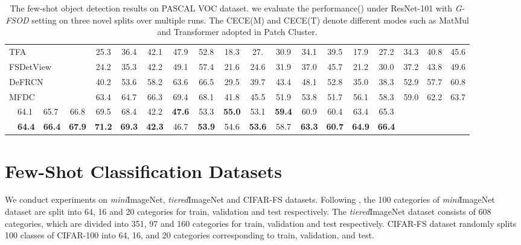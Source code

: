 \documentclass{article}
\begin{document}
\begin{table*}[t]
{{\begin{tabular}{l|l|l|c|ccccc|ccccc|ccccc}
\multicolumn{4}{l|}{TFA \cite{wang2020frustratingly}}           & 25.3         & 36.4          & 42.1          & 47.9          & 52.8          & 18.3          & 27.          & 30.9          & 34.1          & 39.5          & 17.9          & 27.2          & 34.3          & 40.8          & 45.6          \\
\multicolumn{4}{l|}{FSDetView \cite{Xiao2020FSDetView}}          & 24.2          & 35.3          &  42.2         & 49.1          & 57.4       & 21.6         & 24.6          & 31.9       & 37.0         & 45.7         & 21.2         & 30.0         & 37.2         & 43.8         & 49.6  \\
\multicolumn{4}{l|}{{DeFRCN} \cite{qiao2021defrcn}}   & 40.2 & 53.6 & 58.2 & 63.6 & {66.5} & 29.5 & 39.7 & 43.4 & 48.1 & {52.8} & 35.0 & 38.3 & 52.9 & 57.7 & 60.8 \\
\multicolumn{4}{l|}{{MFDC} \cite{wu2022multi} }  & {63.4} & {64.7} & {66.3} & {69.4} & {68.1} & {41.8} & {45.5} & {51.9} & {53.8} & {51.7} & {56.1} & {58.3} & {59.0} & {62.2} & {63.7} \\
\midrule[0.9pt]
\rowcolor[HTML]{EFEFEF}
\multicolumn{4}{l|}{\textbf{MFDC+CECE(M)}}  & {64.1} & {65.7} & {66.8} & {69.5} & {68.4} & {42.2} & \textbf{47.6} & {53.3} & \textbf{55.0} & {53.1} & \textbf{59.4} & {60.9} & {60.4} & {63.4} & {65.3} \\
\rowcolor[HTML]{EFEFEF}
\multicolumn{4}{l|}{\textbf{MFDC+CECE(T)}}  & \textbf{64.4} & \textbf{66.4} & \textbf{67.9} & \textbf{71.2} & \textbf{69.3} & \textbf{42.3} & {46.7} & \textbf{53.9} & {54.6} & \textbf{53.6} & {58.7} & \textbf{63.3} & \textbf{60.7} & \textbf{64.9} & \textbf{66.4} \\
\bottomrule[1.1pt]
\end{tabular}}}
\vspace{-0.2cm}
\caption{The few-shot object detection results on PASCAL VOC dataset. we evaluate the performance() under ResNet-101 with \textit{G-FSOD} setting on three novel splits over multiple runs.
The CECE(M) and CECE(T) denote different modes such as MatMul and Transformer adopted in Patch Cluster.}
\label{tab:voc_result}
\end{table*}




\section{Few-Shot Classification Datasets}
We conduct experiments on \textit{mini}ImageNet, \textit{tiered}ImageNet and CIFAR-FS datasets. Following \cite{hou2019cross}, the 100 categories of \textit{mini}ImageNet dataset are split into 64, 16 and 20 categories for train, validation and test respectively. The \textit{tiered}ImageNet dataset \cite{ren2018meta} consists of 608 categories, which are divided into 351, 97 and 160 categories for train, validation and test respectively.
CIFAR-FS dataset randomly splits 100 classes of CIFAR-100 into 64, 16, and 20 categories corresponding to train, validation, and test.
\end{document}

